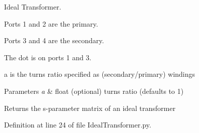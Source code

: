 Ideal Transformer. 

Ports 1 and 2 are the primary.

Ports 3 and 4 are the secondary.

The dot is on ports 1 and 3.

a is the turns ratio specified as (secondary/primary) windings


\begin{DoxyParams}{Parameters}
{\em a} & float (optional) turns ratio (defaults to 1) \\
\hline
\end{DoxyParams}
\begin{DoxyReturn}{Returns}
the s-\/parameter matrix of an ideal transformer 
\end{DoxyReturn}


Definition at line 24 of file Ideal\+Transformer.\+py.

